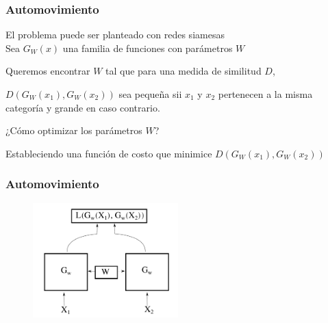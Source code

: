 \documentclass{beamer}
\begin{document}
\begin{frame}
\frametitle{Automovimiento}
El problema puede ser planteado con redes siamesas\\
\vfill
Sea \(G_W(x)\) una familia de funciones con parámetros \(W\)\\
\vfill
	
Queremos encontrar \(W\) tal que para una medida de similitud \(D\),\\

\vfill
	
\(D(G_W(x_1), G_W(x_2))\) sea pequeña sii \(x_1\) y \(x_2\) pertenecen a la misma categoría y
grande en caso contrario.\pause 
\vfill
	
	
¿Cómo optimizar los parámetros \(W\)?\\\pause
\vfill

Estableciendo una función de costo que minimice \(D(G_W(x_1), G_W(x_2))\)
\end{frame}





\begin{frame}
\frametitle{Automovimiento}
\begin{figure}
    \centering
    \includegraphics[width=0.5\textwidth]{images/siamese-diagram.pdf}
\end{figure}
\end{frame}
\end{document}

